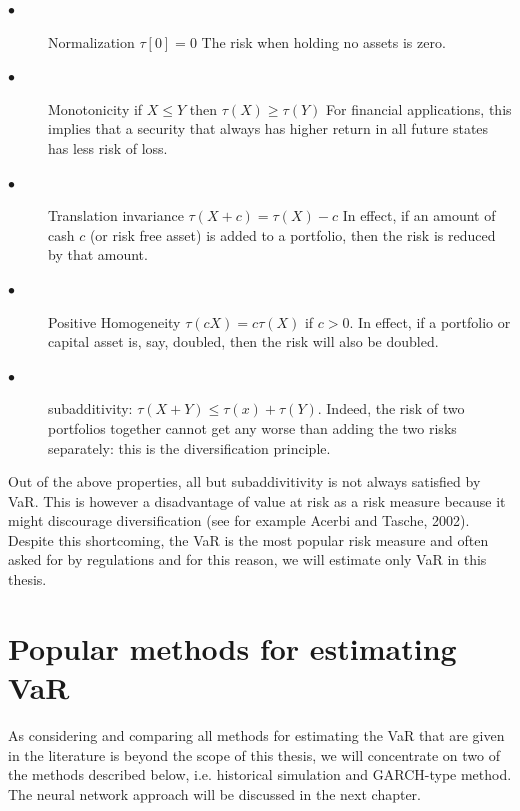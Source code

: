 \documentclass[a4paper,11pt,oneside]{book}
\begin{document}
\begin{description}
	\item[$\bullet$] Normalization \newline $\tau[0] = 0$ \newline The risk when holding no assets is zero.
	\item[$\bullet$] Monotonicity \newline if $X \leq Y$ then $\tau(X) \geq \tau(Y)$ \newline For financial applications, this implies that a
	security that always has higher return in all future states has less risk of loss.
	
	\item[$\bullet$] Translation invariance
	\newline  $\tau(X+c) = \tau(X)-c$ \newline In effect, if an amount of cash $c$ (or risk free asset)
	is added to a portfolio, then the risk is reduced by that amount.
	\item[$\bullet$] Positive Homogeneity
	\newline $\tau(cX) = c\tau(X)$ if $c>0$. \newline In effect, if a portfolio or capital asset is, say,
	doubled, then the risk will also be doubled.
	
		\item[$\bullet$] subadditivity: 
	\newline $\tau(X+Y)\leq \tau(x)+\tau(Y)$. 
	Indeed, the risk of two portfolios together cannot get any worse than adding the two risks separately: this is the diversification principle.
	
\end{description}
Out of the above properties, all but subaddivitivity is not always satisfied by VaR. This is however a disadvantage of value at risk as a risk measure because it might discourage diversification (see for example Acerbi and Tasche, 2002). Despite this shortcoming, the VaR is the most popular risk measure and often asked for by regulations and for this reason, we will estimate only VaR in this thesis.

\section{Popular methods for estimating VaR}
As considering and comparing all methods for estimating the VaR that are given in the literature is beyond the scope of this thesis, we will concentrate on two of the methods described below, i.e. historical simulation and GARCH-type method. The neural network approach will be discussed in the next chapter.
\end{document}
